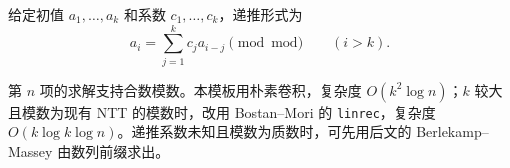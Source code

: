 给定初值 $a_1,\ldots,a_k$ 和系数 $c_1,\ldots,c_k$，递推形式为
\[
a_i=\sum_{j=1}^{k}c_j a_{i-j}\pmod{\mathrm{mod}}\qquad(i>k).
\]

第 $n$ 项的求解支持合数模数。本模板用朴素卷积，复杂度 $O(k^2\log n)$；$k$ 较大且模数为现有 NTT 的模数时，改用 Bostan--Mori 的 \texttt{linrec}，复杂度 $O(k\log k\log n)$。递推系数未知且模数为质数时，可先用后文的 Berlekamp--Massey 由数列前缀求出。
